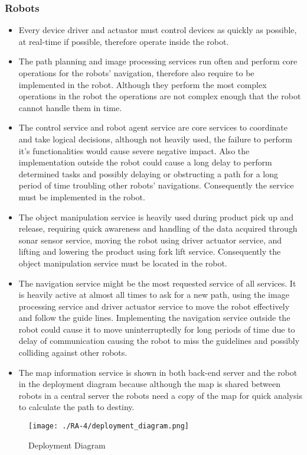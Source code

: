 \subsubsection{Robots}
\begin{itemize}
	\item Every device driver and actuator must control devices as quickly as possible, at real-time if possible, therefore operate inside the robot.
	\item The path planning and image processing services run often and perform core operations for the robots' navigation, therefore also require to be implemented in the robot. Although they perform the most complex operations in the robot the operations are not complex enough that the robot cannot handle them in time.
	\item The control service and robot agent service are core services to coordinate and take logical decisions, although not heavily used, the failure to perform it's functionalities would cause severe negative impact. Also the implementation outside the robot could cause a long delay to perform determined tasks and possibly delaying or obstructing a path for a long period of time troubling other robots' navigations. Consequently the service must be implemented in the robot.
	\item The object manipulation service is heavily used during product pick up and release, requiring quick awareness and handling of the data acquired through sonar sensor service, moving the robot using driver actuator service, and lifting and lowering the product using fork lift service. Consequently the object manipulation service must be located in the robot.
	\item The navigation service might be the most requested service of all services. It is heavily active at almost all times to ask for a new path, using the image processing service and driver actuator service to move the robot effectively and follow the guide lines. Implementing the navigation service outside the robot could cause it to move uninterruptedly for long periods of time due to delay of communication causing the robot to miss the guidelines and possibly colliding against other robots.
	\item The map information service is shown in both back-end server and the robot in the deployment diagram because although the map is shared between robots in a central server the robots need a copy of the map for quick analysis to calculate the path to destiny.
\end{itemize}
\begin{figure}[ht!]
 \centering
 \texttt{[image: ./RA-4/deployment\_diagram.png]}
 \caption{Deployment Diagram}
 \label{fig:deployment_diagram}
\end{figure}
